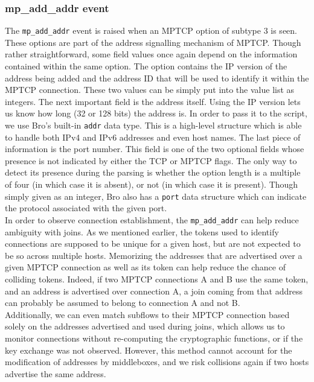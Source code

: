 \subsubsection{mp\_add\_addr event}
The \texttt{mp\_add\_addr} event is raised when an MPTCP option of subtype 3 is seen. These options are part of the address signalling mechanism of MPTCP. Though rather straightforward, some field values once again depend on the information contained within the same option. The option contains the IP version of the address being added and the address ID that will be used to identify it within the MPTCP connection. These two values can be simply put into the value list as integers. The next important field is the address itself. Using the IP version lets us know how long (32 or 128 bits) the address is. In order to pass it to the script, we use Bro's built-in \texttt{addr} data type. This is a high-level structure which is able to handle both IPv4 and IPv6 addresses and even host names. The last piece of information is the port number. This field is one of the two optional fields whose presence is not indicated by either the TCP or MPTCP flags. The only way to detect its presence during the parsing is whether the option length is a multiple of four (in which case it is absent), or not (in which case it is present). Though simply given as an integer, Bro also has a  \texttt{port} data structure which can indicate the protocol associated with the given port. \\

In order to observe connection establishment, the \texttt{mp\_add\_addr} can help reduce ambiguity with joins. As we mentioned earlier, the tokens used to identify connections are supposed to be unique for a given host, but are not expected to be so across multiple hosts. Memorizing the addresses that are advertised over a given MPTCP connection as well as its token can help reduce the chance of colliding tokens. Indeed, if two MPTCP connections A and B use the same token, and an address is advertised over connection A, a join coming from that address can probably be assumed to belong to connection A and not B. \\

Additionally, we can even match subflows to their MPTCP connection based solely on the addresses advertised and used during joins, which allows us to monitor connections without re-computing the cryptographic functions, or if the key exchange was not observed. However, this method cannot account for the modification of addresses by middleboxes, and we risk collisions again if two hosts advertise the same address.

